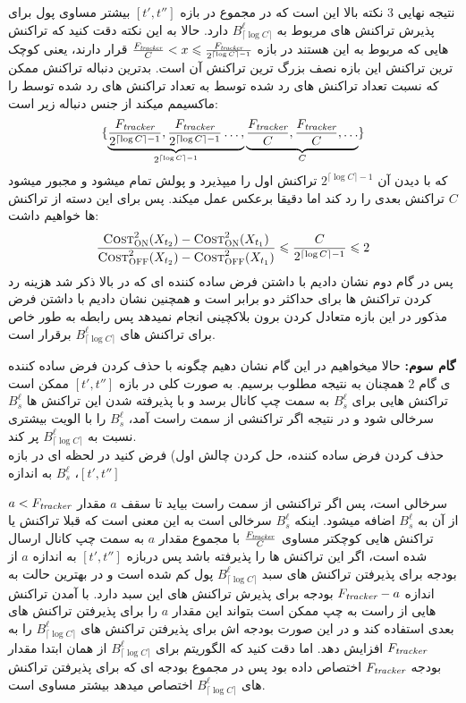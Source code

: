 نتیجه نهایی 3 نکته بالا این است که در مجموع در بازه 
$[t',t'']$
\on بیشتر مساوی
\off پول برای پذیرش تراکنش های
مربوط به \bucket
$B_{\lceil\log{C}\rceil}^{\ell}$
دارد.
حالا به این نکته دقت کنید که تراکنش هایی که مربوط به این \bucket هستند در بازه
$\frac{F_{\textit{tracker}}}{C}< x \leqslant \frac{F_{\textit{tracker}}}{2^{\lceil\log{C}\rceil-1}}$
قرار دارند، یعنی کوچک ترین تراکنش این بازه نصف بزرگ ترین تراکنش آن است. بدترین دنباله تراکنش ممکن که نسبت تعداد تراکنش های رد شده توسط
\on 
 به تعداد تراکنش های رد شده توسط \off را ماکسیمم میکند
از جنس دنباله زیر است:
\begin{equation}
\{\underbrace{\frac{F_{\textit{tracker}}}{2^{\lceil\log{C}\rceil-1}} , \frac{F_{\textit{tracker}}}{2^{\lceil\log{C}\rceil-1}} \dots,}_{2^{\lceil\log{C}\rceil-1}}\underbrace{\frac{F_{\textit{tracker}}}{C} , \frac{F_{\textit{tracker}}}{C} , \dots}_{C}\}
\end{equation}
که با دیدن آن \on
$2^{\lceil\log{C}\rceil-1}$
تراکنش اول را میپذیرد و پولش تمام میشود و مجبور میشود
$C$
تراکنش بعدی را رد کند اما \off دقیقا برعکس عمل میکند. پس برای این دسته از تراکنش ها خواهیم داشت:
\begin{dmath}
\frac{\coston^2(X_{t_2})  -  \coston^2(X_{t_1})}{\costoff^2(X_{t_2})  -  \costoff^2(X_{t_1})} \leq \frac{C}{2^{\lceil\log{C}\rceil-1}} \leq 2
\end{dmath}
پس در گام دوم نشان دادیم با داشتن فرض ساده کننده ای که در بالا ذکر شد هزینه رد کردن تراکنش ها برای \on حداکثر دو برابر \off است و همچنین نشان دادیم با داشتن فرض مذکور \off در این بازه متعادل کردن برون بلاکچینی انجام نمیدهد پس رابطه  به طور خاص برای تراکنش های \bucket
$B_{\lceil\log{C}\rceil}^{\ell}$
برقرار است.

\textbf{گام سوم:}
حالا میخواهیم در این گام نشان دهیم چگونه با حذف کردن فرض ساده کننده ی گام 2 همچنان به نتیجه مطلوب برسیم. به صورت کلی در بازه 
$[t',t'']$
ممکن است تراکنش هایی برای \bucket
$B_s^{\ell}$
به سمت چپ کانال برسد و با پذیرفته شدن این تراکنش ها
$B_s^{\ell}$
سرخالی شود و در نتیجه اگر تراکنشی از سمت راست آمد،
$B_s^{\ell}$
را با الویت بیشتری نسبت به
$B_{\lceil\log{C}\rceil}^{\ell}$
پر کند.  \\
حذف کردن فرض ساده کننده، حل کردن چالش اول) فرض کنید در لحظه ای در بازه
$[t',t'']$،
$B_s^{\ell}$
به اندازه

$a < F_{\textit{tracker}}$
سرخالی است، پس اگر تراکنشی از سمت راست بیاید تا سقف
$a$
مقدار از آن به
$B_s^{\ell}$
اضافه میشود.
اینکه
$B_s^{\ell}$
سرخالی است به این معنی است که قبلا تراکنش یا تراکنش هایی کوچکتر مساوی
$\frac{F_{\textit{tracker}}}{C}$
با مجموع مقدار
$a$
به سمت چپ کانال ارسال شده است، اگر \off این تراکنش ها را پذیرفته باشد پس دربازه $[t',t'']$ به اندازه $a$ از بودجه \off برای پذیرفتن تراکنش های سبد
$B_{\lceil\log{C}\rceil}^{\ell}$
 پول کم شده است و در بهترین حالت \off
به اندازه
$F_{\textit{tracker}} - a$
بودجه برای پذیرش تراکنش های این سبد 
دارد. با آمدن تراکنش هایی از راست به چپ \off ممکن است بتواند این مقدار $a$ را برای پذیرفتن تراکنش های بعدی استفاده کند و در این صورت بودجه اش برای پذیرفتن تراکنش های 
$B_{\lceil\log{C}\rceil}^{\ell}$  
را به 
$F_{\textit{tracker}}$
افزایش دهد. اما دقت کنید که الگوریتم \on برای 
$B_{\lceil\log{C}\rceil}^{\ell}$ 
از همان ابتدا مقدار بودجه
$F_{\textit{tracker}}$
اختصاص داده بود پس در مجموع بودجه ای که \on برای پذیرفتن تراکنش های \bucket
$B_{\lceil\log{C}\rceil}^{\ell}$ 
اختصاص میدهد بیشتر مساوی \off است.

